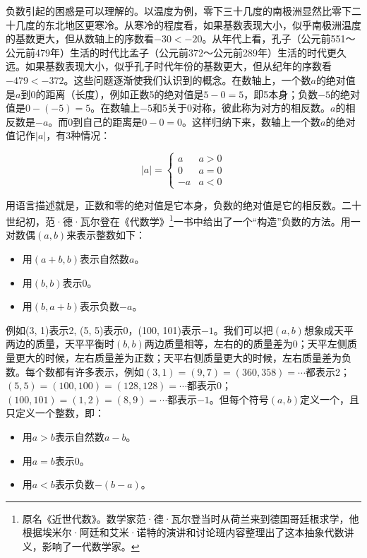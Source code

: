 \documentclass[b5paper]{ctexart}
\begin{document}
负数引起的困惑是可以理解的。以温度为例，零下三十几度的南极洲显然比零下二十几度的东北地区更寒冷。从寒冷的程度看，如果基数表现大小，似乎南极洲温度的基数更大，但从数轴上的序数看$-30 < -20$。从年代上看，孔子（公元前551～公元前479年）生活的时代比孟子（公元前372～公元前289年）生活的时代更久远。如果基数表现大小，似乎孔子时代年份的基数更大，但从纪年的序数看$-479 < -372$。这些问题逐渐使我们认识到的概念。在数轴上，一个数$a$的绝对值是$a$到0的距离（长度），例如正数5的绝对值是$5 - 0 = 5$，即5本身；负数$-5$的绝对值是$0 - (-5) = 5$。在数轴上$-5$和5关于0对称，彼此称为对方的相反数。$a$的相反数是$-a$。而0到自己的距离是$0 - 0 = 0$。这样归纳下来，数轴上一个数$a$的绝对值记作$|a|$，有3种情况：

\[
|a| = \begin{cases}
  a & a > 0 \\
  0 & a = 0 \\
  -a & a < 0
\end{cases}
\]

  \label{sec:z-as-pair}
用语言描述就是，正数和零的绝对值是它本身，负数的绝对值是它的相反数。二十世纪初，范·德·瓦尔登在《代数学》\footnote{原名《近世代数》。数学家范·德·瓦尔登当时从荷兰来到德国哥廷根求学，他根据埃米尔·阿廷和艾米·诺特的演讲和讨论班内容整理出了这本抽象代数讲义，影响了一代数学家。}一书中给出了一个“构造”负数的方法。用一对数偶$(a, b)$来表示整数如下：
\begin{itemize}
\item 用$(a + b, b)$表示自然数$a$。
\item 用$(b, b)$表示0。
\item 用$(b, a + b)$表示负数$-a$。
\end{itemize}

例如(3, 1)表示2, (5, 5)表示0，(100, 101)表示$-1$。我们可以把$(a, b)$想象成天平两边的质量，天平平衡时$(b, b)$两边质量相等，左右的的质量差为0；天平左侧质量更大的时候，左右质量差为正数；天平右侧质量更大的时候，左右质量差为负数。每个数都有许多表示，例如$(3, 1) = (9, 7) = (360, 358) = \cdots$都表示2；$(5, 5) = (100, 100) = (128, 128) = \cdots$都表示0；$(100, 101) = (1, 2) = (8, 9) = \cdots$都表示$-1$。但每个符号$(a, b)$定义一个，且只定义一个整数，即：

\begin{itemize}
\item 用$a > b$表示自然数$a - b$。
\item 用$a = b$表示0。
\item 用$a < b$表示负数$-(b - a)$。
\end{itemize}
\end{document}
